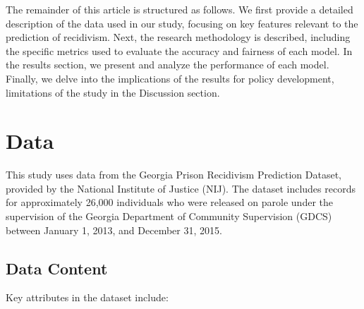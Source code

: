 \documentclass[12pt]{article}
\begin{document}
The remainder of this article is structured as follows. We first provide a detailed description of the data used in our study, focusing on key features relevant to the prediction of recidivism. Next, the research methodology is described, including the specific metrics used to evaluate the accuracy and fairness of each model. In the results section, we present and analyze the performance of each model. Finally, we delve into the implications of the results for policy development, limitations of the study in the Discussion section.


\section{Data}

This study uses data from the Georgia Prison Recidivism Prediction Dataset, provided by the National Institute of Justice (NIJ). The dataset includes records for approximately 26,000 individuals who were released on parole under the supervision of the Georgia Department of Community Supervision (GDCS) between January 1, 2013, and December 31, 2015. 

\subsection{Data Content}
Key attributes in the dataset include:
\end{document}
